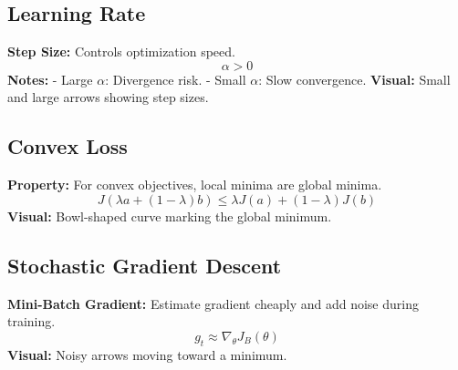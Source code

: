 \documentclass[10pt]{article}
\begin{document}
\subsection*{Learning Rate}
\textbf{Step Size:} Controls optimization speed.  
\[
\alpha > 0
\]  
\textbf{Notes:}  
- Large \(\alpha\): Divergence risk.  
- Small \(\alpha\): Slow convergence.  
\textbf{Visual:} Small and large arrows showing step sizes.

\subsection*{Convex Loss}
\textbf{Property:} For convex objectives, local minima are global minima.  
\[
J(\lambda a + (1-\lambda)b) \leq \lambda J(a) + (1-\lambda) J(b)
\]  
\textbf{Visual:} Bowl-shaped curve marking the global minimum.

\subsection*{Stochastic Gradient Descent}
\textbf{Mini-Batch Gradient:} Estimate gradient cheaply and add noise during training.  
\[
g_t \approx \nabla_\theta J_B(\theta)
\]  
\textbf{Visual:} Noisy arrows moving toward a minimum.
\end{document}
